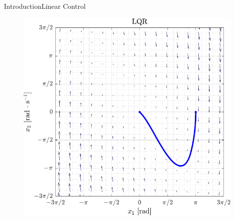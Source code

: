 \begin{frame}{Introduction}{Linear Control}
  \begin{figure}[H]
    \includegraphics[width=.55\textwidth]{figures/LQRphasePlot}
  \end{figure}
\end{frame}



